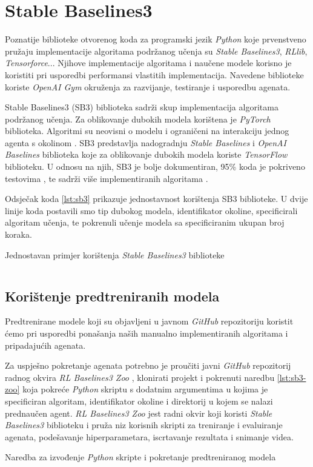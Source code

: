\chapter{Stable Baselines3}

Poznatije biblioteke otvorenog koda za programski jezik \textit{Python} koje prvenstveno pružaju implementacije algoritama podržanog učenja su \textit{Stable Baselines3}, \textit{RLlib}, \textit{Tensorforce}... Njihove implementacije algoritama i naučene modele korisno je koristiti pri usporedbi performansi vlastitih implementacija. Navedene biblioteke koriste \textit{OpenAI Gym} okruženja za razvijanje, testiranje i usporedbu agenata.

Stable Baselines3 (SB3) biblioteka sadrži skup implementacija algoritama podržanog učenja. Za oblikovanje dubokih modela korištena je \textit{PyTorch} biblioteka. Algoritmi su neovisni o modelu  i ograničeni na interakciju jednog agenta s okolinom . SB3 predstavlja nadogradnju \textit{Stable Baselines} i \textit{OpenAI Baselines} biblioteka koje za oblikovanje dubokih modela koriste \textit{TensorFlow} biblioteku. U odnosu na njih, SB3 je bolje dokumentiran, 95\% koda je pokriveno testovima , te sadrži više implementiranih algoritama \cite{SB3}. 

Odsječak koda \ref{lst:sb3} prikazuje jednostavnost korištenja SB3 biblioteke. U dvije linije koda postavili smo tip dubokog modela, identifikator okoline, specificirali algoritam učenja, te pokrenuli učenje modela sa specificiranim ukupan broj koraka.

\begin{listing}[H]
    \caption{Jednostavan primjer korištenja \textit{Stable Baselines3} biblioteke}
    \inputminted{python}{snippets/sb3.py}
    \label{lst:sb3}
\end{listing}

\section{Korištenje predtreniranih modela}

Predtrenirane modele koji su objavljeni u javnom \textit{GitHub} repozitoriju \cite{sb3-alg-repo} koristit ćemo pri usporedbi ponašanja naših manualno implementiranih algoritama i pripadajućih agenata.

Za uspješno pokretanje agenata potrebno je proučiti javni \textit{GitHub} repozitorij radnog okvira \textit{RL Baselines3 Zoo} \cite{rl-zoo3}, klonirati projekt i pokrenuti naredbu \ref{lst:sb3-zoo} koja pokreće \textit{Python} skriptu s dodatnim argumentima u kojima je specificiran algoritam, identifikator okoline i direktorij u kojem se nalazi prednaučen agent. \textit{RL Baselines3 Zoo} jest radni okvir koji koristi \textit{Stable Baselines3} biblioteku i pruža niz korisnih skripti za treniranje i evaluiranje agenata, podešavanje hiperparametara, iscrtavanje rezultata i snimanje videa.

\begin{listing}[H]
    \caption{Naredba za izvođenje \textit{Python} skripte i pokretanje predtreniranog modela}
    \inputminted{powershell}{snippets/sb3-zoo.txt}
    \label{lst:sb3-zoo}
\end{listing}
